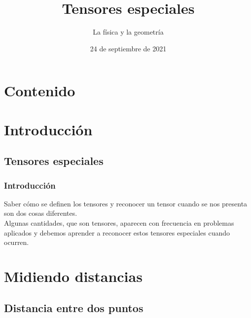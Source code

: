 \documentclass[12pt]{beamer}
\date{24 de septiembre de 2021}
\title{Tensores especiales}
\subtitle{La física y la geometría}
\begin{document}
\maketitle
\fontsize{14}{14}\selectfont
{}

\section*{Contenido}

\section{Introducción}
\subsection{Tensores especiales}

\begin{frame}
\frametitle{Introducción}
Saber cómo se definen los tensores y reconocer un tensor cuando se nos presenta son dos cosas diferentes.
\\
\bigskip
\pause
Algunas cantidades, que son tensores, aparecen con frecuencia en problemas aplicados y debemos aprender a reconocer estos tensores especiales cuando ocurren.
\end{frame}

\section{Midiendo distancias}
\subsection{Distancia entre dos puntos}
\end{document}
